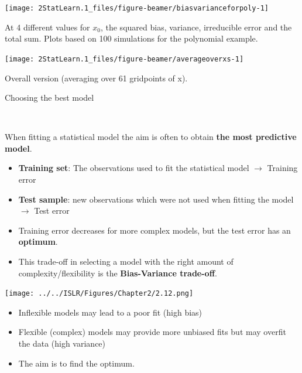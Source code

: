 \documentclass[ignorenonframetext,]{beamer}
\providecommand{\tightlist}{%
  \setlength{\itemsep}{0pt}\setlength{\parskip}{0pt}}
\begin{document}
\begin{frame}

\begin{center}\texttt{[image: 2StatLearn.1\_files/figure-beamer/biasvarianceforpoly-1]} \end{center}

At 4 different values for \(x_0\), the squared bias, variance,
irreducible error and the total sum. Plots based on 100 simulations for
the polynomial example.

\end{frame}

\begin{frame}

\begin{center}\texttt{[image: 2StatLearn.1\_files/figure-beamer/averageoverxs-1]} \end{center}

Overall version (averaging over 61 gridpoints of x).

\end{frame}

\begin{frame}

\begin{block}{Choosing the best model}

\(~\)

When fitting a statistical model the aim is often to obtain \textbf{the
most predictive model}.

\begin{itemize}
\item
  \textbf{Training set}: The observations used to fit the statistical
  model \(\rightarrow\) Training error
\item
  \textbf{Test sample}: new observations which were not used when
  fitting the model \(\rightarrow\) Test error
\item
  Training error decreases for more complex models, but the test error
  has an \textbf{optimum}.
\item
  This trade-off in selecting a model with the right amount of
  complexity/flexibility is the \textbf{Bias-Variance trade-off}.
\end{itemize}

\end{block}

\end{frame}

\begin{frame}

\texttt{[image: ../../ISLR/Figures/Chapter2/2.12.png]}

\begin{itemize}
\tightlist
\item
  Inflexible models may lead to a poor fit (high bias)
\item
  Flexible (complex) models may provide more unbiased fits but may
  overfit the data (high variance)
\item
  The aim is to find the optimum.
\end{itemize}

\end{frame}
\end{document}
